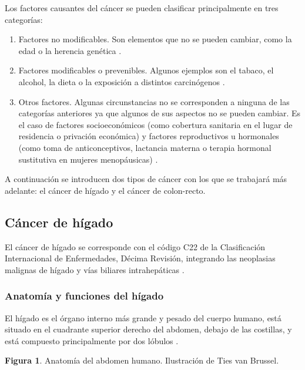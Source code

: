 Los factores causantes del cáncer se pueden clasificar principalmente en tres categorías:
\begin{enumerate}
	\item Factores no modificables. Son elementos que no se pueden cambiar, como la edad o la herencia genética \cite{WorldHealthOrganization2014, WorldHealthOrganization2020}.
	\item Factores modificables o prevenibles. Algunos ejemplos son el tabaco, el alcohol, la dieta o la exposición a distintos carcinógenos \cite{Cogliano2011}.
	\item Otros factores. Algunas circunstancias no se corresponden a ninguna de las categorías anteriores ya que algunos de sus aspectos no se pueden cambiar. Es el caso de  factores socioeconómicos (como cobertura sanitaria en el lugar de residencia o privación económica) y factores reproductivos u hormonales (como toma de anticonceptivos, lactancia materna o terapia hormonal sustitutiva en mujeres menopáusicas) \cite{WorldHealthOrganization2020}.
\end{enumerate}

A continuación se introducen dos tipos de cáncer con los que se trabajará más adelante: el cáncer de hígado y el cáncer de colon-recto.


\subsection{Cáncer de hígado}

El cáncer de hígado se corresponde con el código C22 de la Clasificación Internacional de Enfermedades, Décima Revisión, integrando las neoplasias malignas de hígado y vías biliares intrahepáticas \cite{ICD10, cie10es}.

\subsubsection{Anatomía y funciones del hígado}

El hígado es el órgano interno más grande y pesado del cuerpo humano, está situado en el cuadrante superior derecho del abdomen, debajo de las costillas, y está compuesto principalmente por dos lóbulos \cite{Abdel-Misih2010}.\\

\newpage
\begin{center}
\textbf{Figura 1}. Anatomía del abdomen humano. Ilustración de Ties van Brussel.
\end{center}


